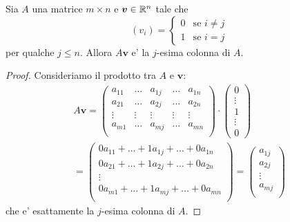 \begin{proposition} \label{j-esima_colonna}
    Sia $A$ una matrice $m \times n$ e $\bm v \in \mathbb{R}^n$ tale che \[(v_i) = \begin{cases}
        0 &\text{se } i \neq j \\
        1 &\text{se } i = j 
    \end{cases}
    \] per qualche $j \leq n$. Allora $A\bm v$ e' la $j$-esima colonna di $A$.
\end{proposition}
\begin{proof}
    Consideriamo il prodotto tra $A$ e $\bm v$: \begin{gather*}
        A\bm v = \begin{pmatrix}
            a_{11}  & \dots   & a_{1j} & \dots  & a_{1n} \\
            a_{21}  & \dots   & a_{2j} & \dots  & a_{2n} \\
            \vdots  & \vdots  & \vdots & \vdots & \vdots \\
            a_{m1}  & \dots   & a_{mj} & \dots  & a_{mn} \\
        \end{pmatrix} \cdot   \begin{pmatrix}
            0 \\ \vdots \\ 1 \\ \vdots \\ 0 
        \end{pmatrix} \\
        = \begin{pmatrix}
            0a_{11}  + \dots   + 1a_{1j} + \dots  + 0a_{1n} \\
            0a_{21}  + \dots   + 1a_{2j} + \dots  + 0a_{2n} \\
            \vdots \\
            0a_{m1}  + \dots   + 1a_{mj} + \dots  + 0a_{mn} \\
        \end{pmatrix} = \begin{pmatrix}
            a_{1j}\\
            a_{2j}\\
            \vdots \\
            a_{mj} \\
        \end{pmatrix}
    \end{gather*}
    che e' esattamente la $j$-esima colonna di $A$.
\end{proof}

